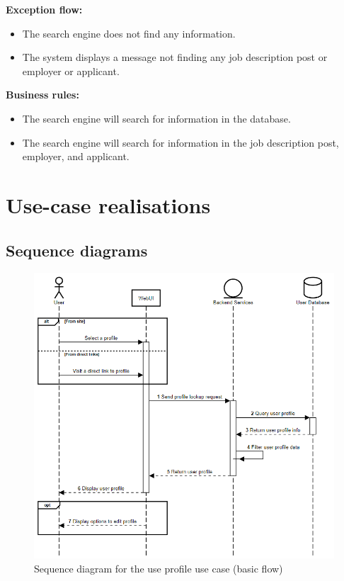 \documentclass[a4paper]{article}
\begin{document}
\textbf{Exception flow:}
\begin{itemize}
    \item The search engine does not find any information.
    \item The system displays a message not finding any job description post or employer or applicant.
\end{itemize}

\textbf{Business rules:}
\begin{itemize}
    \item The search engine will search for information in the database.
    \item The search engine will search for information in the job description post, employer, and applicant.
\end{itemize}

\pagebreak
\section{Use-case realisations}
\subsection{Sequence diagrams}

\begin{figure}[H]
    \centering
    \includegraphics[width=1.0\textwidth]{view_profile.png}
    \caption{Sequence diagram for the use profile use case (basic flow)}
    \label{fig:fig2}
\end{figure}
\end{document}
